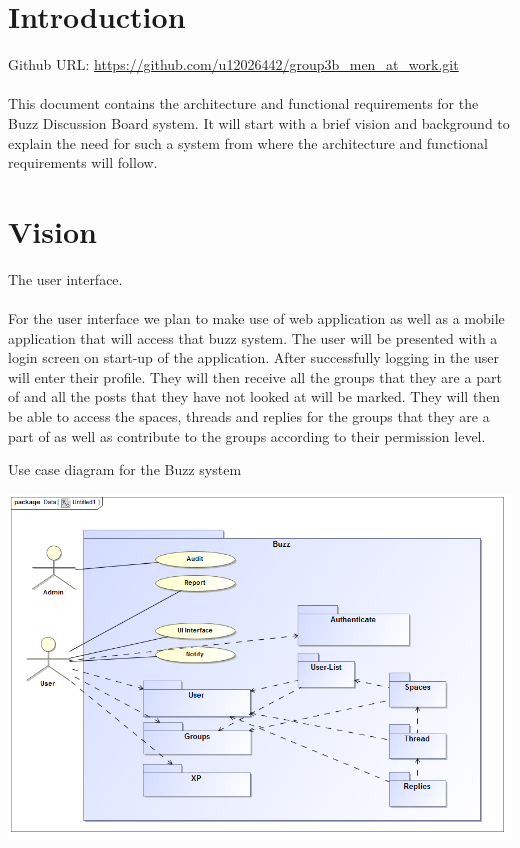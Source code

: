 \documentclass[pdftex,10pt,a4paper]{report}
\begin{document}


\newpage


\newpage
{}

\tableofcontents 

\newpage
{}


\chapter{Introduction}

Github URL: \url{https://github.com/u12026442/group3b_men_at_work.git}
\\
\\
This document contains the architecture and functional requirements for the Buzz Discussion Board system. It will start with a brief  vision and background to explain the need for such a system from where the architecture and functional requirements will follow.


\chapter{Vision}

The user interface.
\\
\\
For the user interface we plan to make use of web application as well as a mobile application that will access that buzz system. The user will be presented with a login screen on start-up of the application. After successfully logging in the user will enter their profile. They will then receive all the groups that they are a part of and all the posts that they have not looked at will be marked. They will then be able to access the spaces, threads and replies for the groups that they are a part of as well as contribute to the groups according to their permission level.

	\begin{description}
		\item[Use case diagram for the Buzz system] 
	\end{description}
	\includegraphics[width=\textwidth]{Buzz}
\end{document}
